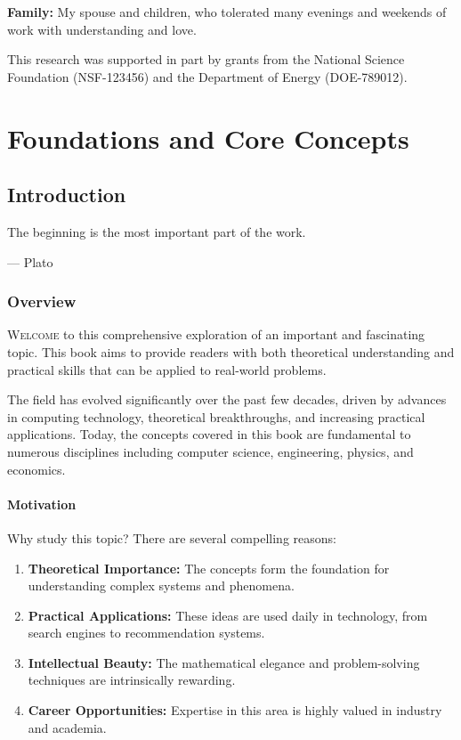 \documentclass[11pt,twoside,openright]{book}
\theoremstyle{plain}
\theoremstyle{definition}
\theoremstyle{remark}
\begin{document}
\textbf{Family:} My spouse and children, who tolerated many evenings and weekends of work with understanding and love.

This research was supported in part by grants from the National Science Foundation (NSF-123456) and the Department of Energy (DOE-789012).

\cleardoublepage

\mainmatter

\part{Foundations and Core Concepts}

\chapter{Introduction}
\label{ch:introduction}

\epigraph{The beginning is the most important part of the work.}{--- Plato}

\section{Overview}
\label{sec:intro-overview}

\lettrine{W}{elcome} to this comprehensive exploration of an important and fascinating topic. This book aims to provide readers with both theoretical understanding and practical skills that can be applied to real-world problems.

The field has evolved significantly over the past few decades, driven by advances in computing technology, theoretical breakthroughs, and increasing practical applications. Today, the concepts covered in this book are fundamental to numerous disciplines including computer science, engineering, physics, and economics.

\subsection{Motivation}
\label{subsec:intro-motivation}

Why study this topic? There are several compelling reasons:

\begin{enumerate}[itemsep=0.5em]
    \item \textbf{Theoretical Importance:} The concepts form the foundation for understanding complex systems and phenomena.
    \item \textbf{Practical Applications:} These ideas are used daily in technology, from search engines to recommendation systems.
    \item \textbf{Intellectual Beauty:} The mathematical elegance and problem-solving techniques are intrinsically rewarding.
    \item \textbf{Career Opportunities:} Expertise in this area is highly valued in industry and academia.
\end{enumerate}
\end{document}

